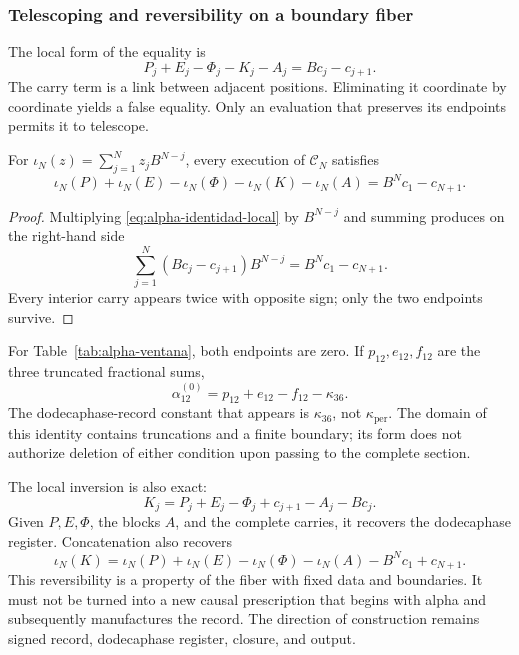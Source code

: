 \subsubsection{Telescoping and reversibility on a boundary fiber}
\label{subsec:alpha-telescopia}

The local form of the equality is
\begin{equation}
 P_j+E_j-\Phi_j-K_j-A_j=Bc_j-c_{j+1}.
 \label{eq:alpha-identidad-local}
\end{equation}
The carry term is a link between adjacent positions. Eliminating it
coordinate by coordinate yields a false equality. Only an evaluation that
preserves its endpoints permits it to telescope.

\begin{proposition}
\label{prop:alpha-telescopia}
For \(\iota_N(z)=\sum_{j=1}^{N}z_jB^{N-j}\), every execution of
\(\mathcal C_N\) satisfies
\begin{equation}
 \iota_N(P)+\iota_N(E)-\iota_N(\Phi)-\iota_N(K)-\iota_N(A)
 =B^Nc_1-c_{N+1}.
 \label{eq:alpha-telescopia}
\end{equation}
\end{proposition}

\begin{proof}
Multiplying \eqref{eq:alpha-identidad-local} by \(B^{N-j}\) and summing
produces on the right-hand side
\[
 \sum_{j=1}^{N}(Bc_j-c_{j+1})B^{N-j}=B^Nc_1-c_{N+1}.
\]
Every interior carry appears twice with opposite sign; only the two endpoints
survive.
\end{proof}

For Table~\ref{tab:alpha-ventana}, both endpoints are zero. If
\(p_{12},e_{12},f_{12}\) are the three truncated fractional sums,
\[
 \alpha_{12}^{(0)}=p_{12}+e_{12}-f_{12}-\kappa_{36}.
\]
The dodecaphase-record constant that appears is \(\kappa_{36}\), not
\(\kappa_{\mathrm{per}}\). The domain of this identity contains truncations
and a finite boundary; its form does not authorize deletion of either
condition upon passing to the complete section.

The local inversion is also exact:
\[
 K_j=P_j+E_j-\Phi_j+c_{j+1}-A_j-Bc_j.
\]
Given \(P,E,\Phi\), the blocks \(A\), and the complete carries, it recovers
the dodecaphase register. Concatenation also recovers
\[
 \iota_N(K)=\iota_N(P)+\iota_N(E)-\iota_N(\Phi)-\iota_N(A)
             -B^Nc_1+c_{N+1}.
\]
This reversibility is a property of the fiber with fixed data and boundaries.
It must not be turned into a new causal prescription that begins with alpha
and subsequently manufactures the record. The direction of construction
remains signed record, dodecaphase register, closure, and output.

